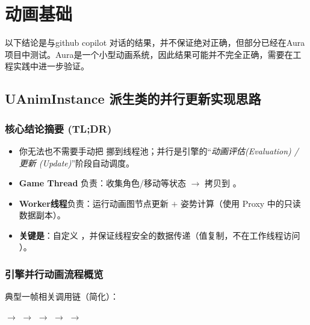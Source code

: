 \documentclass[10pt,openright,oneside,CJKmath]{MyBook}
\begin{document}
\mainmatter


\chapter{动画基础}
以下结论是与github copilot 对话的结果，并不保证绝对正确，但部分已经在Aura项目中测试。Aura是一个小型动画系统，因此结果可能并不完全正确，需要在工程实践中进一步验证。
\section{UAnimInstance 派生类的并行更新实现思路}

\subsection{核心结论摘要 (TL;DR)}
\begin{itemize}
  \item 你无法也不需要手动把  挪到线程池；并行是引擎的“\emph{动画评估(Evaluation) / 更新 (Update)}”阶段自动调度。
  \item \textbf{Game Thread} 负责：收集角色/移动等状态 $\rightarrow$ 拷贝到 。
  \item \textbf{Worker线程}负责：运行动画图节点更新 $+$ 姿势计算（使用 Proxy 中的只读数据副本）。
  \item \textbf{关键是}：自定义 ，并保证线程安全的数据传递（值复制，不在工作线程访问 ）。
\end{itemize}

\subsection{引擎并行动画流程概览}
典型一帧相关调用链（简化）：

 $\rightarrow$  $\rightarrow$
 $\rightarrow$  $\rightarrow$  $\rightarrow$
\end{document}
